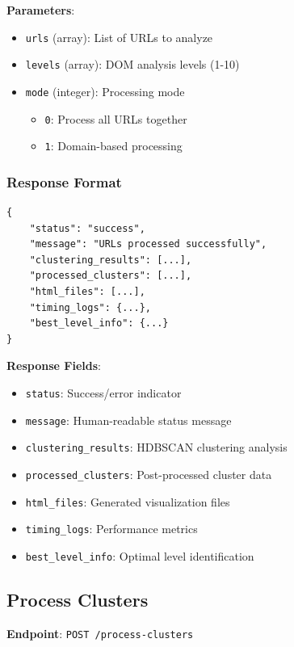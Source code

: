 \textbf{Parameters}:
\begin{itemize}
    \item \texttt{urls} (array): List of URLs to analyze
    \item \texttt{levels} (array): DOM analysis levels (1-10)
    \item \texttt{mode} (integer): Processing mode
        \begin{itemize}
            \item \texttt{0}: Process all URLs together
            \item \texttt{1}: Domain-based processing
        \end{itemize}
\end{itemize}

\subsubsection{Response Format}
\label{subsubsec:response-format}

\begin{verbatim}
{
    "status": "success",
    "message": "URLs processed successfully",
    "clustering_results": [...],
    "processed_clusters": [...],
    "html_files": [...],
    "timing_logs": {...},
    "best_level_info": {...}
}
\end{verbatim}

\textbf{Response Fields}:
\begin{itemize}
    \item \texttt{status}: Success/error indicator
    \item \texttt{message}: Human-readable status message
    \item \texttt{clustering\_results}: HDBSCAN clustering analysis
    \item \texttt{processed\_clusters}: Post-processed cluster data
    \item \texttt{html\_files}: Generated visualization files
    \item \texttt{timing\_logs}: Performance metrics
    \item \texttt{best\_level\_info}: Optimal level identification
\end{itemize}

\subsection{Process Clusters}
\label{subsec:process-clusters}

\textbf{Endpoint}: \texttt{POST /process-clusters}

